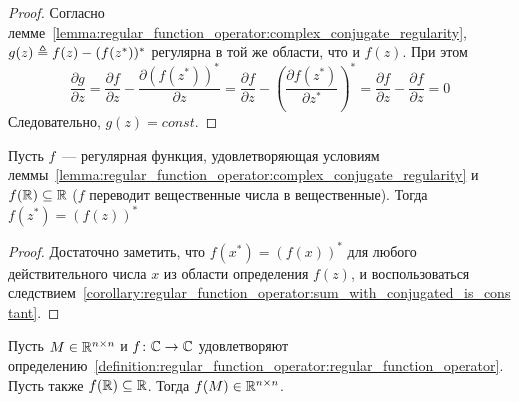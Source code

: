 \begin{proof}
    Согласно лемме~\ref{lemma:regular_function_operator:complex_conjugate_regularity},
    $ g(z) \triangleq f(z) - (f(z^*))^* $ регулярна в той же области, что и $ f(z) $.
    При этом
    \[
        \frac{\partial g}{\partial z} = \frac{\partial f}{\partial z} - \frac{\partial (f(z^*))^*}{\partial z} =
        \frac{\partial f}{\partial z} - \left( \frac{\partial f(z^*)}{\partial z^*} \right)^* =
        \frac{\partial f}{\partial z} - \frac{\partial f}{\partial z} = 0
    \]
    Следовательно, $ g(z) = const $.
\end{proof}


\begin{corollary}
    \label{corollary:regular_function_operator:sum_with_conjugated_is_zero}
    Пусть $ f $~--- регулярная функция, удовлетворяющая условиям
    леммы~\ref{lemma:regular_function_operator:complex_conjugate_regularity}
    и $ f(\mathbb{R}) \subseteq \mathbb{R} $ ($ f $ переводит вещественные числа в вещественные).
    Тогда $ f(z^*) = (f(z))^* $
\end{corollary}

\begin{proof}
    Достаточно заметить, что $ f(x^*) = (f(x))^* $ для любого действительного числа $ x $
    из области определения $ f(z) $, и воспользоваться
    следствием~\ref{corollary:regular_function_operator:sum_with_conjugated_is_constant}.
\end{proof}


\begin{theorem}
    \label{theorem:regular_function_operator:real_valued_matrix_function}
    Пусть $ M \in \mathbb{R}^{n \times n} $ и $ f \colon \mathbb{C} \to \mathbb{C} $
    удовлетворяют определению~\ref{definition:regular_function_operator:regular_function_operator}.
    Пусть также $ f(\mathbb{R}) \subseteq \mathbb{R} $.
    Тогда $ f(M) \in \mathbb{R}^{n \times n} $.
\end{theorem}

